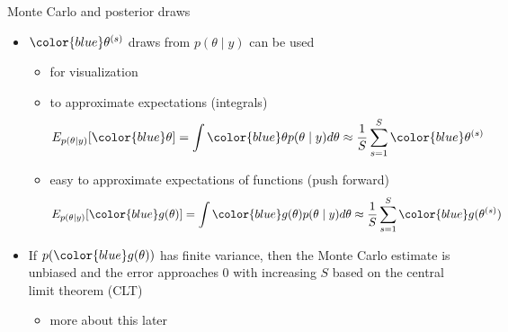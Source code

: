 \documentclass[finnish,english,t]{beamer}
\begin{document}
\begin{frame}{Monte Carlo and posterior draws}
  
  \begin{itemize}
  \item ${\color{blue}\theta^{(s)}}$ draws from $p(\theta \mid y)$ can be used
    \begin{itemize}
    \item<1-> for visualization
    \item<2-> to approximate expectations (integrals)
      \begin{align*}
        E_{p(\theta \mid y)}[{\color{blue}\theta}] = \int {\color{blue}\theta} p(\theta \mid y) d\theta \approx \frac{1}{S}\sum_{s=1}^{S} {\color{blue}\theta^{(s)}}
      \end{align*}
    \item<3-> easy to approximate expectations of functions (push forward)
      \begin{align*}
        E_{p(\theta \mid y)}[{\color{blue}g(\theta)}] = \int {\color{blue}g(\theta)} p(\theta \mid y) d\theta \approx \frac{1}{S}\sum_{s=1}^{S} {\color{blue}g(\theta^{(s)})}
      \end{align*}
    \end{itemize}
  \item<4-> If $p({\color{blue}g(\theta)})$ has finite variance, then
    the Monte Carlo estimate is unbiased and the error approaches 0
    with increasing $S$ based on the central limit theorem (CLT)
    \begin{itemize}
    \item more about this later
    \end{itemize}
  \end{itemize}

\end{frame}
\end{document}
